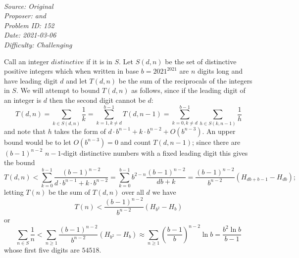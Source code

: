 \SSbreak\\
\emph{Source: Original}\\
\emph{Proposer: \Ptan and \Pwen}\\
\emph{Problem ID: 152}\\
\emph{Date: 2021-03-06}\\
\emph{Difficulty: Challenging}\\
\SSbreak

\bigskip

\begin{solution}\hfil\medskip
  
    Call an integer $\textit{distinctive}$ if it is in $S$. Let $S(d, n)$ be the set of distinctive positive integers which when written in base $b = 2021^{2021}$ are $n$ digits long and have leading digit $d$
    and let $T(d, n)$ be the sum of the reciprocals of the integers in $S$. We will attempt to bound $T(d, n)$ as follows, since if the leading digit of an integer is $d$ then the second digit cannot be $d$:
    $$T(d, n) = \sum_{k \in S(d, n)} \dfrac{1}{k} = \sum_{k = 1, k \neq d}^{b - 1} T(d, n - 1) = \sum_{k = 0, k \neq d}^{b - 1} \sum_{h \in S(k, n - 1)} \dfrac{1}{h}$$
    and note that $h$ takes the form of $d \cdot b^{n - 1} + k \cdot b^{n - 2} + O\left(b^{n - 3}\right)$. 
    An upper bound would be to let $O\left(b^{n - 3}\right) = 0$ and count $T(d, n - 1)$; since there are $(b - 1)^{n - 2}$ $n - 1$-digit distinctive numbers with a fixed leading digit this gives the bound
    $$T(d, n) < \sum_{k = 0}^{b - 1} \dfrac{(b - 1)^{n - 2}}{d \cdot b^{n - 1} + k \cdot b^{n - 2}} = \sum_{k = 0}^{b - 1} b^{2 - n} \dfrac{(b - 1)^{n - 2}}{db + k} = \dfrac{(b - 1)^{n - 2}}{b^{n - 2}} \left(H_{db + b - 1} - H_{db}\right);$$
    letting $T(n)$ be the sum of $T(d, n)$ over all $d$ we have $$T(n) < \dfrac{(b - 1)^{n - 2}}{b^{n - 2}} \left(H_{b^2} - H_b\right)$$
    or $$\sum_{n \in S} \dfrac{1}{n} < \sum_{n \geq 1} \dfrac{(b - 1)^{n - 2}}{b^{n - 2}} \left(H_{b^2} - H_b\right) \approx \sum_{n \geq 1} \left(\dfrac{b - 1}{b}\right)^{n - 2} \ln b = \dfrac{b^2 \ln b}{b - 1}$$
    whose first five digits are $54518$. \medskip


\end{solution}

